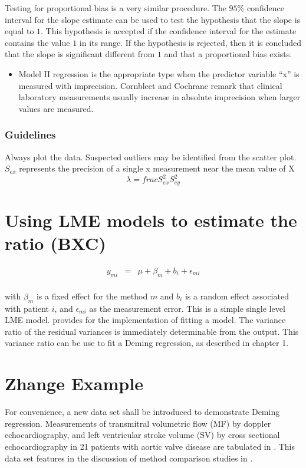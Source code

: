 \documentclass[12pt, a4paper]{report}
\theoremstyle{plain}
\theoremstyle{definition}
\theoremstyle{remark}
\begin{document}
Testing for proportional bias is a very similar procedure. The $95\%$ confidence interval for the slope estimate can be used to
test the hypothesis that the slope is equal to $1$. This hypothesis is accepted if the confidence interval for the estimate
contains the value $1$ in its range. If the hypothesis is rejected, then it is concluded that the slope is significant
different from $1$ and that a proportional bias exists.

\begin{itemize}
\item Model II regression is the appropriate type when the predictor variable “x” is measured with imprecision.
	Cornbleet and Cochrane remark that clinical laboratory measurements usually increase in absolute imprecision when larger values are measured. %
\end{itemize}

\subsubsection*{Guidelines}
Always plot the data. Suspected outliers may be identified from the scatter plot.
$S_{ex}$  represents the precision of a single x measurement near the mean value of X
\[\lambda = frac{S^2_{ex}}{S^2_{ey}}\]






\section{Using LME models to estimate the ratio (BXC) }

\begin{eqnarray*}
	y_{mi} &=& \mu + \beta_{m} + b_{i} + \epsilon_{mi}\\
\end{eqnarray*}

with $\beta_{m}$ is a fixed effect for the method $m$ and $b_{i}$ is a random effect associated with patient $i$, and
$\epsilon_{mi}$ as the measurement error. This is a simple single level LME model. \citet{pb} provides for the implementation of fitting a model. The variance ratio of the residual variances is immediately determinable from the output. This variance ratio can be use to fit a Deming regression, as described in chapter 1.




\section{Zhange Example}
For convenience, a new data set shall be introduced to demonstrate Deming regression. Measurements of transmitral volumetric flow (MF) by doppler echocardiography, and left ventricular stroke volume (SV) by cross sectional echocardiography in 21 patients
with aortic valve disease are tabulated in \citet{zhang}. This data set features in the discussion of method comparison studies
in \citet[p.398]{AltmanBook} .
\end{document}
